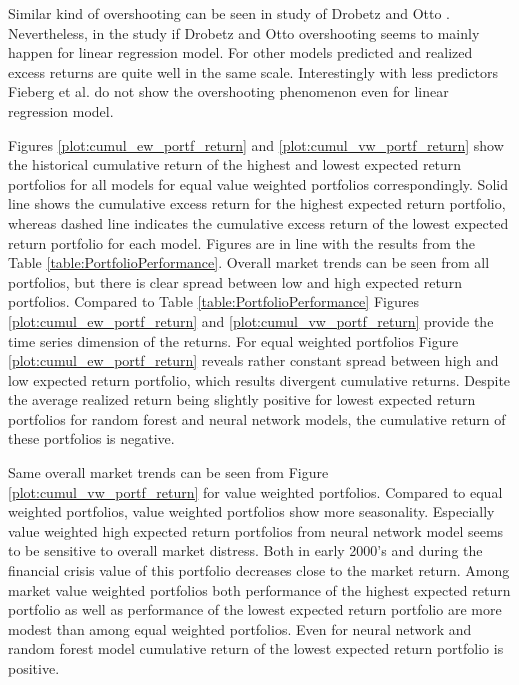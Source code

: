 \documentclass{article}
\begin{document}
Similar kind of overshooting can be seen in study of Drobetz and Otto \citeyear{Drobetz}. Nevertheless, in the study if Drobetz and Otto overshooting seems to mainly happen for linear regression model. For other models predicted and realized excess returns are quite well in the same scale. Interestingly with less predictors Fieberg et al. \citeyear{Fieberg} do not show the overshooting phenomenon even for linear regression model. \par

Figures \ref{plot:cumul_ew_portf_return} and \ref{plot:cumul_vw_portf_return} show the historical cumulative return of the highest and lowest expected return portfolios for all models for equal value weighted portfolios correspondingly. Solid line shows the cumulative excess return for the highest expected return portfolio, whereas dashed line indicates the cumulative excess return of the lowest expected return portfolio for each model. Figures are in line with the results from the Table \ref{table:PortfolioPerformance}. Overall market trends can be seen from all portfolios, but there is clear spread between low and high expected return portfolios. Compared to Table \ref{table:PortfolioPerformance} Figures \ref{plot:cumul_ew_portf_return} and \ref{plot:cumul_vw_portf_return} provide the time series dimension of the returns. For equal weighted portfolios Figure \ref{plot:cumul_ew_portf_return} reveals rather constant spread between high and low expected return portfolio, which results divergent cumulative returns. Despite the average realized return being slightly positive for lowest expected return portfolios for random forest and neural network models, the cumulative return of these portfolios is negative. \par

Same overall market trends can be seen from Figure \ref{plot:cumul_vw_portf_return} for value weighted portfolios. Compared to equal weighted portfolios, value weighted portfolios show more seasonality. Especially value weighted high expected return portfolios from neural network model seems to be sensitive to overall market distress. Both in early 2000's and during the financial crisis value of this portfolio decreases close to the market return. Among market value weighted portfolios both performance of the highest expected return portfolio as well as performance of the lowest expected return portfolio are more modest than among equal weighted portfolios. Even for neural network and random forest model cumulative return of the lowest expected return portfolio is positive. \par
\end{document}
